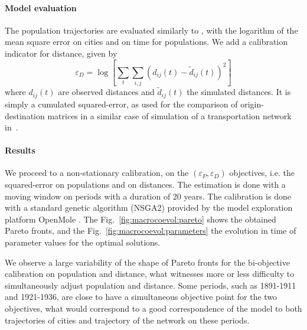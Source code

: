 \documentclass[11pt]{article}
\begin{document}
\paragraph{Model evaluation}


The population trajectories are evaluated similarly to \cite{raimbault2018indirect}, with the logarithm of the mean square error on cities and on time for populations. We add a calibration indicator for distance, given by
\[
\varepsilon_D = \log \left[ \sum_t \sum_{i,j} \left(d_{ij}(t) - \tilde{d}_{ij}(t)\right)^2\right]
\]
where $d_{ij}(t)$ are observed distances and $\tilde{d}_{ij}(t)$ the simulated distances. It is simply a cumulated squared-error, as used for the comparison of origin-destination matrices in a similar case of simulation of a transportation network in~\cite{jacobs2016transport}.



\paragraph{Results}

We proceed to a non-stationary calibration, on the $(\varepsilon_P,\varepsilon_D)$ objectives, i.e. the squared-error on populations and on distances. The estimation is done with a moving window on periods with a duration of 20 years. The calibration is done with a standard genetic algorithm (NSGA2) provided by the model exploration platform OpenMole \citep{reuillon2013openmole}. The Fig.~\ref{fig:macrocoevol:pareto} shows the obtained Pareto fronts, and the Fig.~\ref{fig:macrocoevol:parameters} the evolution in time of parameter values for the optimal solutions.

We observe a large variability of the shape of Pareto fronts for the bi-objective calibration on population and distance, what witnesses more or less difficulty to simultaneously adjust population and distance. Some periods, such as 1891-1911 and 1921-1936, are close to have a simultaneous objective point for the two objectives, what would correspond to a good correspondence of the model to both trajectories of cities and trajectory of the network on these periods. 
\end{document}
